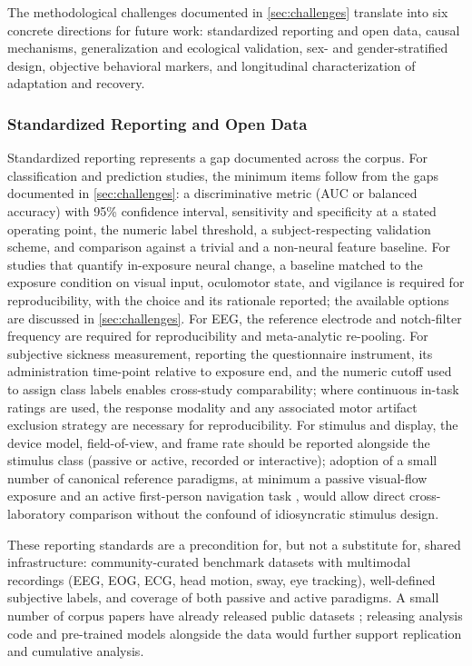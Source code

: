 The methodological challenges documented in \autoref{sec:challenges} translate into six concrete directions for future work: standardized reporting and open data, causal mechanisms, generalization and ecological validation, sex- and gender-stratified design, objective behavioral markers, and longitudinal characterization of adaptation and recovery.

\subsubsection{Standardized Reporting and Open Data}
Standardized reporting represents a gap documented across the corpus.
For classification and prediction studies, the minimum items follow from the gaps documented in \autoref{sec:challenges}: a discriminative metric (AUC or balanced accuracy) with 95\% confidence interval, sensitivity and specificity at a stated operating point, the numeric label threshold, a subject-respecting validation scheme, and comparison against a trivial and a non-neural feature baseline.
For studies that quantify in-exposure neural change, a baseline matched to the exposure condition on visual input, oculomotor state, and vigilance is required for reproducibility, with the choice and its rationale reported; the available options are discussed in \autoref{sec:challenges}.
For EEG, the reference electrode and notch-filter frequency are required for reproducibility and meta-analytic re-pooling.
For subjective sickness measurement, reporting the questionnaire instrument, its administration time-point relative to exposure end, and the numeric cutoff used to assign class labels enables cross-study comparability; where continuous in-task ratings are used, the response modality and any associated motor artifact exclusion strategy are necessary for reproducibility.
For stimulus and display, the device model, field-of-view, and frame rate should be reported alongside the stimulus class (passive or active, recorded or interactive); adoption of a small number of canonical reference paradigms, at minimum a passive visual-flow exposure \cite{suwandiExploringImpactMotion2024} and an active first-person navigation task \cite{cortesEEGbasedExperimentVR2023}, would allow direct cross-laboratory comparison without the confound of idiosyncratic stimulus design.

These reporting standards are a precondition for, but not a substitute for, shared infrastructure: community-curated benchmark datasets with multimodal recordings (EEG, EOG, ECG, head motion, sway, eye tracking), well-defined subjective labels, and coverage of both passive and active paradigms.
A small number of corpus papers have already released public datasets \cite{kimDeepCybersicknessPredictor2019, dasdemirClassificationEmotionalImmersive2023}; releasing analysis code and pre-trained models alongside the data would further support replication and cumulative analysis.

